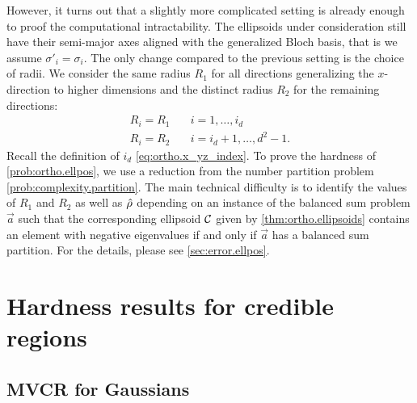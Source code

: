 However, it turns out that a slightly more complicated setting is already enough to proof the computational intractability.
The ellipsoids under consideration still have their semi-major axes aligned with the generalized Bloch basis, that is we assume $\sigma'_i = \sigma_i$.
The only change compared to the previous setting is the choice of radii.
We consider the same radius $R_{1}$ for all directions generalizing the $x$-direction to higher dimensions and the distinct radius $R_{2}$ for the remaining directions:
\[
  \label{eq:ortho.subclass}
  \begin{split}
    R_{i}=R_{1} &\quad i=1,\ldots,i_{d}\\
    R_{i}=R_{2} &\quad i=i_{d}+1,\ldots,d^{2}-1.
  \end{split}
\]
Recall the definition of $i_d$ \cref{eq:ortho.x_yz_index}.
To prove the hardness of \cref{prob:ortho.ellpos}, we use a reduction from the number partition problem \ref{prob:complexity.partition}.
The main technical difficulty is to identify the values of $R_1$ and $R_2$ as well as $\hat{\rho}$ depending on an instance of the balanced sum problem $\vec a$ such that the corresponding ellipsoid $\mathcal{C}$ given by \cref{thm:ortho.ellipsoids} contains an element with negative eigenvalues if and only if $\vec a$ has a balanced sum partition.
For the details, please see \cref{sec:error.ellpos}.















\section{Hardness results for credible regions}
\label{sec:bayesian}


\subsection{MVCR for Gaussians}
\label{sub:bayesian.gaussian}

